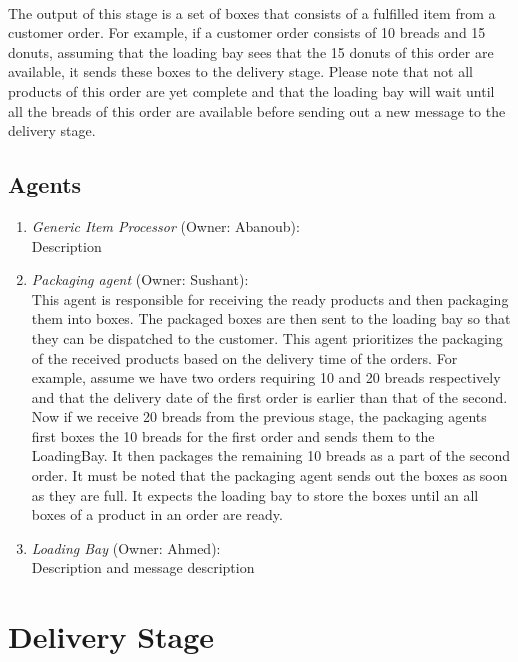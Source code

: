 \documentclass[11pt, a4paper]{article}
\begin{document}
\paragraph{}
The output of this stage is a set of boxes that consists of a fulfilled item from a customer order. For example, if a customer order consists of 10 breads and 15 donuts, assuming that the loading bay sees that the 15 donuts of this order are available, it sends these boxes to the delivery stage. Please note that not all products of this order are yet complete and that the loading bay will wait until all the breads of this order are available before sending out a new message to the delivery stage.

\subsection{Agents}\label{PackagingAgents}
\begin{enumerate}
	\item \textit{Generic Item Processor} (Owner: Abanoub):\\
	Description
	\item \textit{Packaging agent} (Owner: Sushant):\\
	This agent is responsible for receiving the ready products and then packaging them into boxes. The packaged boxes are then sent to the loading bay so that they can be dispatched to the customer. This agent prioritizes the packaging of the received products based on the delivery time of the orders. For example, assume we have two orders requiring 10 and 20 breads respectively and that the delivery date of the first order is earlier than that of the second. Now if we receive 20 breads from the previous stage, the packaging agents first boxes the 10 breads for the first order and sends them to the LoadingBay. It then packages the remaining 10 breads as a part of the second order. It must be noted that the packaging agent sends out the boxes as soon as they are full. It expects the loading bay to store the boxes until an all boxes of a product in an order are ready.
	\item \textit{Loading Bay} (Owner: Ahmed):\\
	Description and message description
\end{enumerate}

\newpage
\section{Delivery Stage}\label{DeliveryStage}
\end{document}

